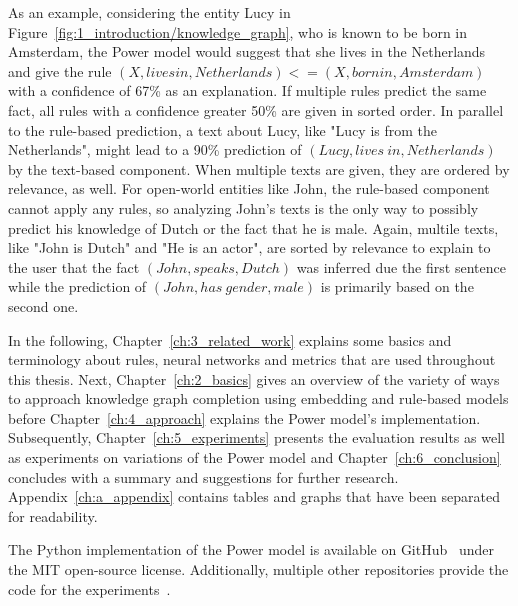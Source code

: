 As an example, considering the entity Lucy in Figure~\ref{fig:1_introduction/knowledge_graph}, who is known to be born in Amsterdam, the Power model would suggest that she lives in the Netherlands and give the rule $(X, lives in, Netherlands) <= (X, born in, Amsterdam)$ with a confidence of 67\% as an explanation. If multiple rules predict the same fact, all rules with a confidence greater 50\% are given in sorted order. In parallel to the rule-based prediction, a text about Lucy, like "Lucy is from the Netherlands", might lead to a 90\% prediction of $(Lucy, lives~in, Netherlands)$ by the text-based component. When multiple texts are given, they are ordered by relevance, as well. For open-world entities like John, the rule-based component cannot apply any rules, so analyzing John's texts is the only way to possibly predict his knowledge of Dutch or the fact that he is male. Again, multile texts, like "John is Dutch" and "He is an actor", are sorted by relevance to explain to the user that the fact $(John, speaks, Dutch)$ was inferred due the first sentence while the prediction of $(John, has~gender, male)$ is primarily based on the second one.

In the following, Chapter~\ref{ch:3_related_work} explains some basics and terminology about rules, neural networks and metrics that are used throughout this thesis. Next, Chapter~\ref{ch:2_basics} gives an overview of the variety of ways to approach knowledge graph completion using embedding and rule-based models before Chapter~\ref{ch:4_approach} explains the Power model's implementation. Subsequently, Chapter~\ref{ch:5_experiments} presents the evaluation results as well as experiments on variations of the Power model and Chapter~\ref{ch:6_conclusion} concludes with a summary and suggestions for further research. Appendix~\ref{ch:a_appendix} contains tables and graphs that have been separated for readability.

The Python implementation of the Power model is available on GitHub~\cite{GitHubPower} under the MIT open-source license. Additionally, multiple other repositories provide the code for the experiments~\cite{}.
